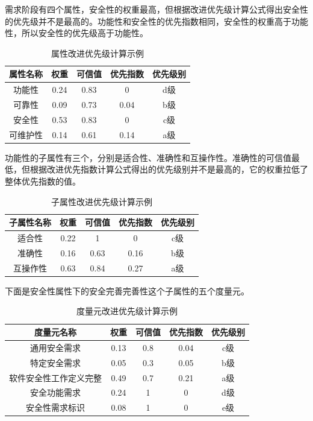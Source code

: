 需求阶段有四个属性，安全性的权重最高，但根据改进优先级计算公式得出安全性的优先级并不是最高的。功能性和安全性的优先指数相同，安全性的权重高于功能性，所以安全性的优先级高于功能性。
\begin{table}[!ht]
	\centering
	\renewcommand\arraystretch{1.3}
	\caption{属性改进优先级计算示例}
	\begin{tabular}{|c|c|c|c|c|}
		\hline
		\textbf{属性名称} & \textbf{权重} & \textbf{可信值} & \textbf{优先指数} & \textbf{优先级别}\\ 
		\hline
		功能性 & 0.24 & 0.83 & 0 & d级  \\
		\hline
		可靠性 & 0.09 & 0.73 & 0.04 & b级\\
		\hline
		安全性 &  0.53 & 0.83 & 0 & c级 \\
		\hline
		可维护性  & 0.14 & 0.61 & 0.14 & a级 \\
		\hline
	\end{tabular}
	\label{tab-4-1}
\end{table}

功能性的子属性有三个，分别是适合性、准确性和互操作性。准确性的可信值最低，但根据改进优先指数计算公式得出的优先级别并不是最高的，它的权重拉低了整体优先指数的值。
\begin{table}[!ht]
	\centering
	\renewcommand\arraystretch{1.3}
	\caption{子属性改进优先级计算示例}
	\begin{tabular}{|c|c|c|c|c|}
		\hline
		\textbf{子属性名称} & \textbf{权重} & \textbf{可信值} & \textbf{优先指数} & \textbf{优先级别}\\ 
		\hline
		适合性 & 0.22 & 1 & 0 & c级  \\
		\hline
		准确性 & 0.16 & 0.63 & 0.16 & b级\\
		\hline
		互操作性 &  0.63 & 0.84 & 0.27 & a级 \\
		\hline
	\end{tabular}
	\label{tab-4-2}
\end{table}

下面是安全性属性下的安全完善完善性这个子属性的五个度量元。
\begin{table}[!ht]
	\centering
	\renewcommand\arraystretch{1.3}
	\caption{度量元改进优先级计算示例}
	\begin{tabular}{|c|c|c|c|c|}
		\hline
		\textbf{度量元名称} & \textbf{权重} & \textbf{可信值} & \textbf{优先指数} & \textbf{优先级别}\\ 
		\hline
		通用安全需求 & 0.13 & 0.8 & 0.04 & c级  \\
		\hline
		特定安全需求 & 0.05 & 0.3 & 0.05 & b级 \\
		\hline
		软件安全性工作定义完整 & 0.49 & 0.7 & 0.21 & a级\\
		\hline
		安全功能需求  &  0.24 & 1 & 0 & d级 \\
		\hline
		安全性需求标识 & 0.08 & 1 & 0 & e级 \\
		\hline
	\end{tabular}
	\label{tab-4-3}
\end{table}



